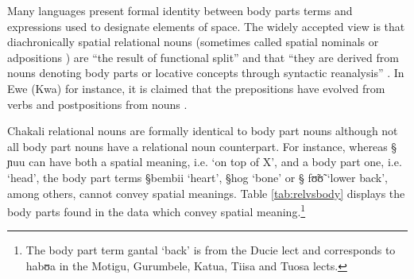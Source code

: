 
Many  languages present formal identity between body parts terms and expressions
used to designate elements of space. The widely accepted view is that
diachronically  spatial relational nouns (sometimes called spatial nominals
\citep[895]{Hell07} or adpositions \citep[137]{Hein97}) are ``the result of
functional split'' and that ``they are derived from nouns denoting body parts or
locative concepts through syntactic reanalysis'' \citep[256]{Hein84}. In Ewe
(Kwa) for instance, it is claimed that  the prepositions have evolved from verbs
and postpositions from nouns \citep[367-369]{Amek06}. 

% 
% 


Chakali relational nouns are formally identical to body part nouns although 
not all body part nouns have a relational noun counterpart. For instance,
whereas {\S
ɲuu} can have both  a spatial meaning, i.e. `on top of X', and  a body part one,
i.e. `head',  the body part terms {\S bembii} `heart', {\S hog} `bone'  or {\S
fʊ̃ʊ̃} `lower back', among others,  cannot convey  spatial meanings. Table
\ref{tab:relvsbody} displays the body parts found in the data which
convey spatial meaning.\footnote{The body part term {\F gantal}
`back' is from
the Ducie lect and corresponds to {\F habʊa} in the Motigu, Gurumbele,
Katua, Tiisa and Tuosa lects.}



